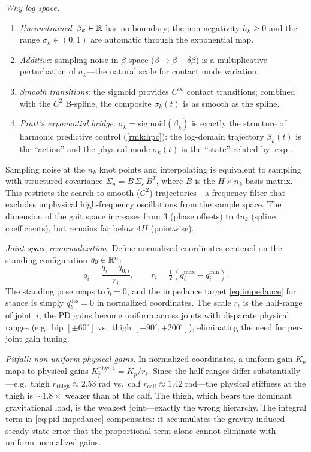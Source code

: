 \smallskip\noindent\emph{Why log space.}
\begin{enumerate}[nosep]
\item \emph{Unconstrained}: $\beta_k \in \mathbb{R}$ has no boundary; the
  non-negativity $h_k \geq 0$ and the range $\sigma_k \in (0,1)$
  are automatic through the exponential map.
\item \emph{Additive}: sampling noise in $\beta$-space
  ($\beta \to \beta + \delta\beta$) is a multiplicative perturbation
  of $\sigma_k$---the natural scale for contact mode variation.
\item \emph{Smooth transitions}: the sigmoid provides $C^\infty$
  contact transitions; combined with the $C^2$ B-spline, the composite
  $\sigma_k(t)$ is as smooth as the spline.
\item \emph{Pratt's exponential bridge}: $\sigma_k = \mathrm{sigmoid}(\beta_k)$
  is exactly the structure of harmonic predictive control
  (\cref{rmk:hpc}): the log-domain trajectory $\beta_k(t)$ is the
  ``action'' and the physical mode $\sigma_k(t)$ is the ``state''
  related by $\exp$.
\end{enumerate}

Sampling noise at the $n_k$ knot points and interpolating is equivalent to
sampling with structured covariance
$\Sigma_u = B\,\Sigma_c\,B^T$, where $B$ is the $H \times n_k$ basis
matrix.
This restricts the search to smooth ($C^2$) trajectories---a frequency
filter that excludes unphysical high-frequency oscillations from the sample
space.
The dimension of the gait space increases from $3$ (phase offsets) to
$4n_k$ (spline coefficients), but remains far below $4H$ (pointwise).

\medskip\noindent\emph{Joint-space renormalization.}
Define normalized coordinates centered on the standing configuration
$q_0 \in \mathbb{R}^n$:
\begin{equation}\label{eq:renormalization}
\tilde{q}_i = \frac{q_i - q_{0,i}}{r_i}, \qquad
r_i = \tfrac{1}{2}(q_i^{\max} - q_i^{\min}).
\end{equation}
The standing pose maps to $\tilde{q} = 0$, and the impedance target
\eqref{eq:impedance} for stance is simply $q_k^{\mathrm{des}} = 0$ in
normalized coordinates.
The scale $r_i$ is the half-range of joint~$i$; the PD gains become
uniform across joints with disparate physical ranges (e.g.\ hip
$[\pm 60^\circ]$ vs.\ thigh $[-90^\circ, +200^\circ]$), eliminating the
need for per-joint gain tuning.

\smallskip
\noindent\emph{Pitfall: non-uniform physical gains.}
In normalized coordinates, a uniform gain $K_p$ maps to physical gains
$K_p^{\mathrm{phys},i} = K_p / r_i$.
Since the half-ranges differ substantially---e.g.\ thigh
$r_{\mathrm{thigh}} \approx 2.53\;\mathrm{rad}$ vs.\ calf
$r_{\mathrm{calf}} \approx 1.42\;\mathrm{rad}$---the physical
stiffness at the thigh is $\sim\!1.8\times$ weaker than at the calf.
The thigh, which bears the dominant gravitational load, is the weakest
joint---exactly the wrong hierarchy.
The integral term in \eqref{eq:pid-impedance} compensates: it accumulates
the gravity-induced steady-state error that the proportional term alone
cannot eliminate with uniform normalized gains.


